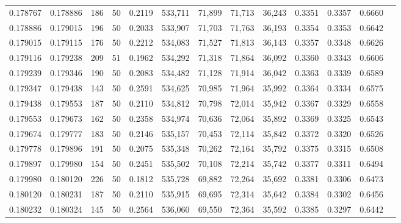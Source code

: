 \begin{tabular}{rrrrrrrrrrrrr}
0.178767 & 0.178886 &   186 &  50 &                                     0.2119 & 533,711 &  71,899 &  71,713 &  36,243 & 0.3351 & 0.3357 & 0.6660 \\
0.178886 & 0.179015 &   196 &  50 &                                     0.2033 & 533,907 &  71,703 &  71,763 &  36,193 & 0.3354 & 0.3353 & 0.6642 \\
0.179015 & 0.179115 &   176 &  50 &                                     0.2212 & 534,083 &  71,527 &  71,813 &  36,143 & 0.3357 & 0.3348 & 0.6626 \\
0.179116 & 0.179238 &   209 &  51 &                                     0.1962 & 534,292 &  71,318 &  71,864 &  36,092 & 0.3360 & 0.3343 & 0.6606 \\
0.179239 & 0.179346 &   190 &  50 &                                     0.2083 & 534,482 &  71,128 &  71,914 &  36,042 & 0.3363 & 0.3339 & 0.6589 \\
0.179347 & 0.179438 &   143 &  50 &                                     0.2591 & 534,625 &  70,985 &  71,964 &  35,992 & 0.3364 & 0.3334 & 0.6575 \\
0.179438 & 0.179553 &   187 &  50 &                                     0.2110 & 534,812 &  70,798 &  72,014 &  35,942 & 0.3367 & 0.3329 & 0.6558 \\
0.179553 & 0.179673 &   162 &  50 &                                     0.2358 & 534,974 &  70,636 &  72,064 &  35,892 & 0.3369 & 0.3325 & 0.6543 \\
0.179674 & 0.179777 &   183 &  50 &                                     0.2146 & 535,157 &  70,453 &  72,114 &  35,842 & 0.3372 & 0.3320 & 0.6526 \\
0.179778 & 0.179896 &   191 &  50 &                                     0.2075 & 535,348 &  70,262 &  72,164 &  35,792 & 0.3375 & 0.3315 & 0.6508 \\
0.179897 & 0.179980 &   154 &  50 &                                     0.2451 & 535,502 &  70,108 &  72,214 &  35,742 & 0.3377 & 0.3311 & 0.6494 \\
0.179980 & 0.180120 &   226 &  50 &                                     0.1812 & 535,728 &  69,882 &  72,264 &  35,692 & 0.3381 & 0.3306 & 0.6473 \\
0.180120 & 0.180231 &   187 &  50 &                                     0.2110 & 535,915 &  69,695 &  72,314 &  35,642 & 0.3384 & 0.3302 & 0.6456 \\
0.180232 & 0.180324 &   145 &  50 &                                     0.2564 & 536,060 &  69,550 &  72,364 &  35,592 & 0.3385 & 0.3297 & 0.6442 \\

\end{tabular}
